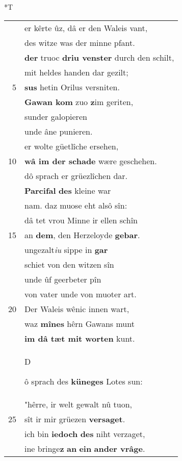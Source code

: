 \documentclass[8pt,a4paper,notitlepage]{article}
\begin{document}
\begin{table}[ht]
\begin{minipage}[t]{0.5\linewidth}
\end{minipage}
\hspace{0.5cm}
\begin{minipage}[t]{0.5\linewidth}
\small
\begin{center}*T
\end{center}
\begin{tabular}{rl}
 & er kêrte ûz, dâ er den Waleis vant,\\ 
 & des witze was der minne pfant.\\ 
 & \textbf{der} truoc \textbf{driu venster} durch den schilt,\\ 
 & mit heldes handen dar gezilt;\\ 
5 & \textbf{sus} hetin Orilus versniten.\\ 
 & \textbf{Gawan kom} zuo \textbf{z}im geriten,\\ 
 & sunder galopieren\\ 
 & unde âne punieren.\\ 
 & er wolte güetlîche ersehen,\\ 
10 & \textbf{wâ im der schade} wære geschehen.\\ 
 & dô sprach er grüezlîchen dar.\\ 
 & \textbf{Parcifal} \textbf{des} kleine war\\ 
 & nam. daz muose eht alsô sîn:\\ 
 & dâ tet vrou Minne ir ellen schîn\\ 
15 & an \textbf{dem}, den Herzeloyde \textbf{gebar}.\\ 
 & ungezalt\textit{iu} sippe in \textbf{gar}\\ 
 & schiet von den witzen sîn\\ 
 & unde ûf geerbeter pîn\\ 
 & von vater unde von muoter art.\\ 
20 & Der Waleis wênic innen wart,\\ 
 & waz \textbf{mînes} hêrn Gawans munt\\ 
 & \textbf{im dâ tæt mit worten} kunt.\\ 
 & \begin{large}D\end{large}ô sprach des \textbf{küneges} Lotes sun:\\ 
 & "hêrre, ir welt gewalt nû tuon,\\ 
25 & sît ir mir grüezen \textbf{versaget}.\\ 
 & ich bin \textbf{iedoch} \textbf{des} niht verzaget,\\ 
 & ine bringe\textbf{z} \textbf{an} \textbf{ein} \textbf{ander vrâge}.\\ 

\end{tabular}
\end{minipage}
\end{table}
\end{document}
